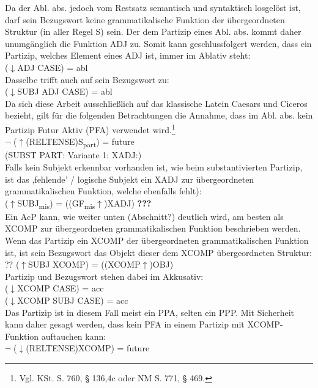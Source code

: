 \documentclass[12pt,a4paper]{article}
\begin{document}
Da der Abl. abs. jedoch vom Restsatz semantisch und syntaktisch losgelöst ist, darf sein Bezugswort keine grammatikalische Funktion der übergeordneten Struktur (in aller Regel S) sein. Der dem Partizip eines Abl. abs. kommt daher unumgänglich die Funktion ADJ zu. Somit kann geschlussfolgert werden, dass ein Partizip, welches Element eines ADJ ist, immer im Ablativ steht: \\
($\downarrow$ADJ CASE) = abl \\
Dasselbe trifft auch auf sein Bezugswort zu: \\
($\downarrow$SUBJ ADJ CASE) = abl \\
Da sich diese Arbeit ausschließlich auf das klassische Latein Caesars und Ciceros bezieht, gilt für die folgenden Betrachtungen die Annahme, dass im Abl. abs. kein Partizip Futur Aktiv (PFA) verwendet wird.\footnote{Vgl. KSt. S. 760, § 136,4c oder NM S. 771, § 469.}\\
$\neg$ ($\uparrow$(RELTENSE)S\textsubscript{part}) = future \\

(SUBST PART: Variante 1: XADJ:) \\
Falls kein Subjekt erkennbar vorhanden ist, wie beim substantivierten Partizip, ist das ,fehlende' / logische Subjekt ein XADJ zur übergeordneten grammatikalischen Funktion, welche ebenfalls fehlt): \\
($\uparrow$SUBJ\textsubscript{mis}) = ((GF\textsubscript{mis}$\uparrow$)XADJ) \textbf{???} \\

Ein AcP kann, wie weiter unten (Abschnitt?) deutlich wird, am besten als XCOMP zur übergeordneten grammatikalischen Funktion beschrieben werden.
Wenn das Partizip ein XCOMP der übergeordneten grammatikalischen Funktion ist, ist sein Bezugswort das Objekt dieser dem XCOMP übergeordneten Struktur: \\ ??
($\uparrow$SUBJ XCOMP) = ((XCOMP$\uparrow$)OBJ) \\
Partizip und Bezugswort stehen dabei im Akkusativ: \\
($\downarrow$XCOMP CASE) = acc \\
($\downarrow$XCOMP SUBJ CASE) = acc \\
Das Partizip ist in diesem Fall meist ein PPA, selten ein PPP. Mit Sicherheit kann daher gesagt werden, dass kein PFA in einem Partizip mit XCOMP-Funktion auftauchen kann: \\
$\neg$ ($\downarrow$(RELTENSE)XCOMP) = future \\
\end{document}

